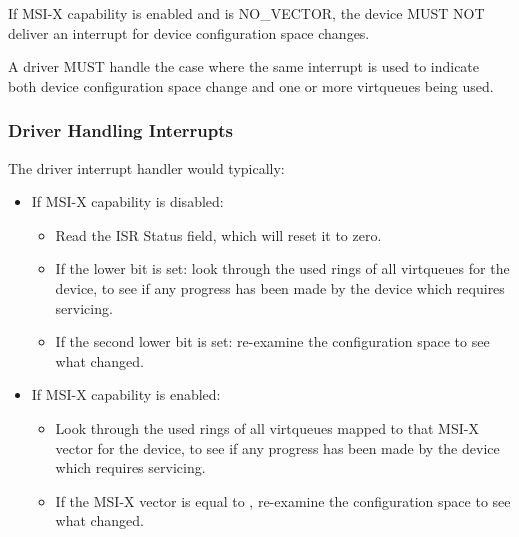 If MSI-X capability is enabled and  is
NO_VECTOR, the device MUST NOT deliver an interrupt
for device configuration space changes.


A driver MUST handle the case where the same interrupt is used to indicate
both device configuration space change and one or more virtqueues being used.

\subsubsection{Driver Handling Interrupts}\label{sec:Virtio Transport Options / Virtio Over PCI Bus / PCI-specific Initialization And Device Operation / Driver Handling Interrupts}
The driver interrupt handler would typically:

\begin{itemize}
  \item If MSI-X capability is disabled:
    \begin{itemize}
      \item Read the ISR Status field, which will reset it to zero.
      \item If the lower bit is set:
        look through the used rings of all virtqueues for the
        device, to see if any progress has been made by the device
        which requires servicing.
      \item If the second lower bit is set:
        re-examine the configuration space to see what changed.
    \end{itemize}
  \item If MSI-X capability is enabled:
    \begin{itemize}
      \item
        Look through the used rings of
        all virtqueues mapped to that MSI-X vector for the
        device, to see if any progress has been made by the device
        which requires servicing.
      \item
        If the MSI-X vector is equal to ,
        re-examine the configuration space to see what changed.
    \end{itemize}
\end{itemize}

